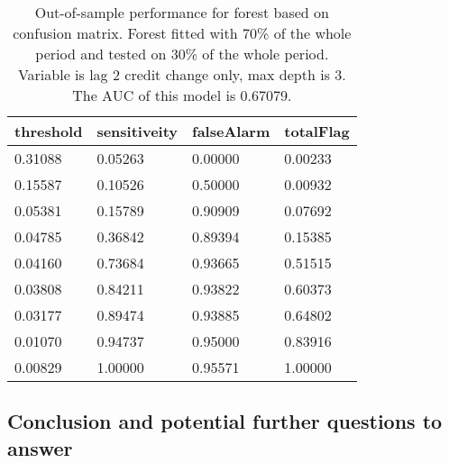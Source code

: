 \documentclass{article}
\begin{document}
\begin{table}[H]
{    }
    \hfill
    \parbox{.45\linewidth}{
        \begin{tabular}{|l|l|l|l|}
        \hline
         threshold           & sensitiveity        & falseAlarm         & totalFlag            \\ \hline
        0.31088  & 0.05263 & 0.00000                & 0.00233 \\ \hline
        0.15587  & 0.10526 & 0.50000                & 0.00932 \\ \hline
        0.05381   & 0.15789 & 0.90909 & 0.07692  \\ \hline
        0.04785 & 0.36842  & 0.89394 & 0.15385  \\ \hline
        0.04160  & 0.73684  & 0.93665 & 0.51515   \\ \hline
        0.03808  & 0.84211  & 0.93822 & 0.60373   \\ \hline
        0.03177  & 0.89474  & 0.93885 & 0.64802   \\ \hline
        0.01070 & 0.94737  & 0.95000               & 0.83916   \\ \hline
        0.00829  & 1.00000                 & 0.95571 & 1.00000                  \\ \hline
        \end{tabular}
        \caption{Out-of-sample performance for forest based on confusion matrix. Forest fitted with 70\% of the whole period and tested on
        30\% of the whole period. Variable is lag 2 credit change only,
        max depth is 3. The AUC of this model is 0.67079.}
    }
\end{table}

\subsection*{Conclusion and potential further questions to answer}
\end{document}
